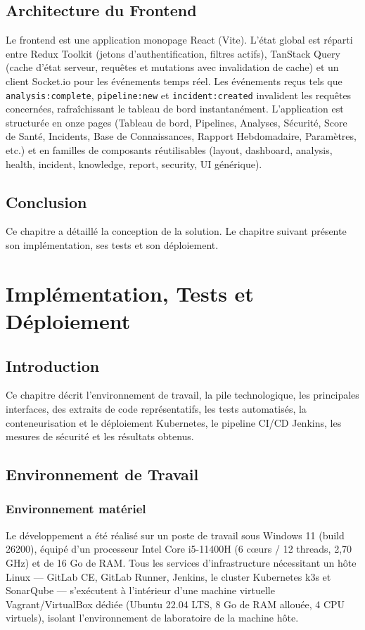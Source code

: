 \documentclass[12pt,a4paper,oneside]{report}
\begin{document}
\section{Architecture du Frontend}
Le frontend est une application monopage React (Vite). L'état global est réparti entre Redux Toolkit (jetons d'authentification, filtres actifs), TanStack Query (cache d'état serveur, requêtes et mutations avec invalidation de cache) et un client Socket.io pour les événements temps réel. Les événements reçus tels que \texttt{analysis:complete}, \texttt{pipeline:new} et \texttt{incident:created} invalident les requêtes concernées, rafraîchissant le tableau de bord instantanément. L'application est structurée en onze pages (Tableau de bord, Pipelines, Analyses, Sécurité, Score de Santé, Incidents, Base de Connaissances, Rapport Hebdomadaire, Paramètres, etc.) et en familles de composants réutilisables (layout, dashboard, analysis, health, incident, knowledge, report, security, UI générique).

\section{Conclusion}
Ce chapitre a détaillé la conception de la solution. Le chapitre suivant présente son implémentation, ses tests et son déploiement.

\chapter{Implémentation, Tests et Déploiement}\label{chap:impl}
\section{Introduction}
Ce chapitre décrit l'environnement de travail, la pile technologique, les principales interfaces, des extraits de code représentatifs, les tests automatisés, la conteneurisation et le déploiement Kubernetes, le pipeline CI/CD Jenkins, les mesures de sécurité et les résultats obtenus.

\section{Environnement de Travail}
\subsection{Environnement matériel}
Le développement a été réalisé sur un poste de travail sous Windows 11 (build 26200), équipé d'un processeur Intel Core i5-11400H (6 cœurs / 12 threads, 2,70 GHz) et de 16 Go de RAM. Tous les services d'infrastructure nécessitant un hôte Linux --- GitLab CE, GitLab Runner, Jenkins, le cluster Kubernetes k3s et SonarQube --- s'exécutent à l'intérieur d'une machine virtuelle Vagrant/VirtualBox dédiée (Ubuntu 22.04 LTS, 8 Go de RAM allouée, 4 CPU virtuels), isolant l'environnement de laboratoire de la machine hôte.
\end{document}
